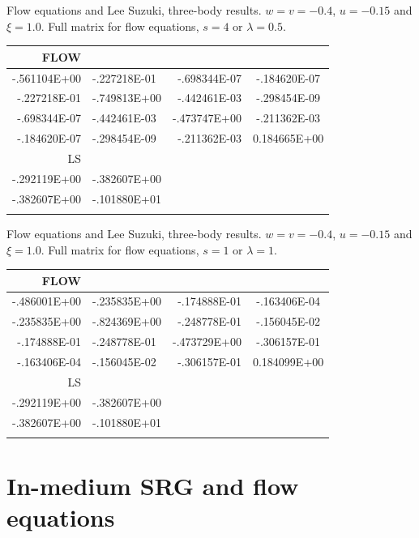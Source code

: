 Flow equations and Lee Suzuki, three-body results. 
$w=v=-0.4$, $u=-0.15$ and $\xi=1.0$. Full matrix for flow equations, $s=4$ or $\lambda=0.5$. 
\begin{center}
\begin{tabular}{rlrc}\\\hline
FLOW& & & \\ \hline
 -.561104E+00 &   -.227218E-01 &   -.698344E-07 &   -.184620E-07\\
    -.227218E-01 &   -.749813E+00 &   -.442461E-03  &  -.298454E-09\\
    -.698344E-07 &   -.442461E-03  &  -.473747E+00 &   -.211362E-03\\
    -.184620E-07  &  -.298454E-09  &  -.211362E-03 &   0.184665E+00\\
LS& & & \\ \hline
-.292119E+00  &  -.382607E+00 &  &   \\
-.382607E+00  &  -.101880E+01 &  &    \\
& &  & \\ \hline
\end{tabular} 
\end{center} 
Flow equations and Lee Suzuki, three-body results. 
$w=v=-0.4$, $u=-0.15$ and $\xi=1.0$. Full matrix for flow equations, $s=1$ or $\lambda=1$. 
\begin{center}
\begin{tabular}{rlrc}\\\hline
FLOW& & & \\ \hline
   -.486001E+00 &   -.235835E+00 &   -.174888E-01 &   -.163406E-04\\
    -.235835E+00 &   -.824369E+00 &   -.248778E-01  &  -.156045E-02\\
    -.174888E-01 &   -.248778E-01 &   -.473729E+00 &   -.306157E-01\\
    -.163406E-04 &   -.156045E-02 &   -.306157E-01 &   0.184099E+00\\
LS& & & \\ \hline
-.292119E+00  &  -.382607E+00 &  &   \\
-.382607E+00  &  -.101880E+01 &  &    \\
& &  & \\ \hline
\end{tabular} 
\end{center} 





\section{In-medium SRG and flow equations}


